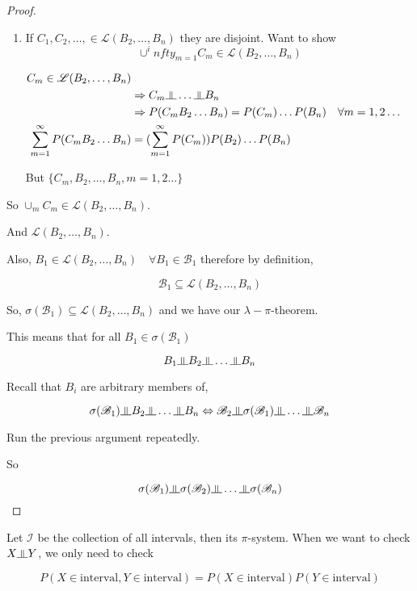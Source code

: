 \documentclass[11pt,fleqn]{book} %
\newcommand{\indep}{\rotatebox[origin=c]{90}{$\models$}}
\begin{document}
\begin{proof}
\begin{enumerate}
		\item If $C_1, C_2, \dots, \in \mathscr{L}(B_2, \dots, B_n)$ they are disjoint. Want to show 
		$$\cup^infty_{m=1}C_m \in \mathscr{L}(B_2, \dots, B_n) $$

		$\begin{aligned}
			C_m \in \mathscr{L}(B_2, \dots, B_n)\\
			&\Rightarrow C_m \indep \dots \indep B_n\\
			&\Rightarrow P(C_m B_2 \dots B_n) = P(C_m)\dots P(B_n) \quad \forall m = 1, 2 \dots\\
			\displaystyle \sum^\infty_{m=1} P(C_m B_2 \dots B_n) &= (\displaystyle \sum^\infty_{m=1} P(C_m) )P(B_2)\dots P(B_n)
		\end{aligned}$

		But $\{C_m, B_2, \dots, B_n, m = 1, 2 \dots \}$


		
	\end{enumerate}
 So $\cup_m C_m \in \mathscr{L}(B_2, \dots, B_n)$. 

		And $\mathscr{L}(B_2, \dots, B_n)$. 

		Also, $ B_1 \in \mathscr{L}(B_2, \dots, B_n) \quad \forall B_1 \in \mathscr{B}_1$ therefore by definition, 

		$$\mathscr{B}_1 \subseteq \mathscr{L}(B_2, \dots, B_n) $$

So, $ \sigma(\mathscr{B}_1) \subseteq \mathscr{L}(B_2, \dots, B_n)$ and we have our $\lambda-\pi$-theorem.

This means that for all $B_1 \in \sigma(\mathscr{B}_1)$

$$B_1 \indep B_2 \indep \dots \indep B_n $$

Recall that $B_i $ are arbitrary members of,

$$\sigma(\mathscr{B}_1) \indep B_2 \indep \dots \indep B_n \Leftrightarrow \mathscr{B}_2 \indep \sigma(\mathscr{B}_1) \indep \dots \indep \mathscr{B}_n$$

Run the previous argument repeatedly. 

So

$$ \sigma(\mathscr{B}_1) \indep \sigma(\mathscr{B}_2) \indep \dots \indep \sigma(\mathscr{B}_n)$$ 

\end{proof}


\begin{example}
	Let $\mathscr{I}$ be the collection of all intervals, then its $\pi$-system. When we want to check $X \indep Y$, we only need to check

	$$P(X \in \text{interval}, Y \in \text{interval}) = P(X \in \text{interval})P(Y \in \text{interval}) $$
\end{example}
\end{document}
